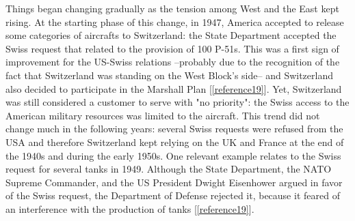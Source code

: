 \documentclass[a4paper]{article}
\begin{document}
Things began changing gradually as the tension among West and the East kept rising. At the starting phase of this change, in 1947, America accepted to release some categories of aircrafts to Switzerland: the State Department accepted the Swiss request that related to the provision of 100 P-51s. This was a first sign of improvement for the US-Swiss relations --probably due to the recognition of the fact that Switzerland was standing on the West Block's side-- and Switzerland also decided to participate in the Marshall Plan [\ref{reference19}]. %
Yet, Switzerland was still considered a customer to serve with "no priority": the Swiss access to the American military resources was limited to the aircraft. This trend did not change much in the following years: several Swiss requests were refused from the USA and therefore Switzerland kept relying on the UK and France at the end of the 1940s and during the early 1950s. One relevant example relates to the Swiss request for several tanks in 1949. Although the State Department, the NATO Supreme Commander, and the US President Dwight Eisenhower argued in favor of the Swiss request, the Department of Defense rejected it, because it feared of an interference with the production of tanks [\ref{reference19}]. %
\end{document}
